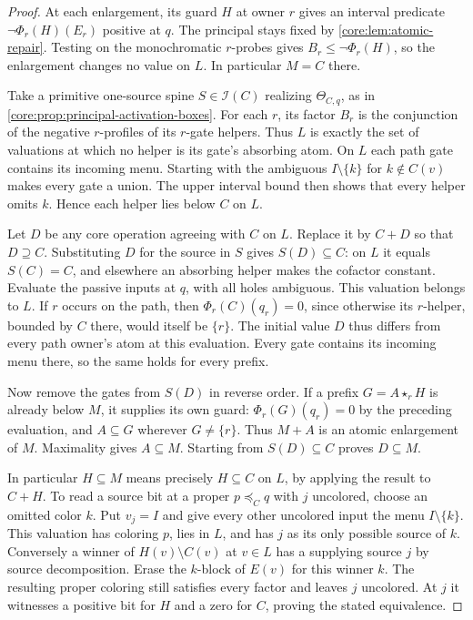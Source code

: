 \begin{proof}
At each enlargement, its guard $H$ at owner $r$ gives an interval
predicate $\neg\Phi_r(H)(E_r)$ positive at $q$. The principal stays
fixed by \cref{core:lem:atomic-repair}. Testing on the monochromatic
$r$-probes gives $B_r\leq\neg\Phi_r(H)$, so the enlargement changes
no value on $L$. In particular $M=C$ there.

Take a primitive one-source spine $S\in\mathcal I(C)$ realizing
$\Theta_{C,q}$, as in \cref{core:prop:principal-activation-boxes}.
For each $r$, its factor $B_r$ is the conjunction of the negative
$r$-profiles of its $r$-gate helpers. Thus $L$ is exactly the set of
valuations at which no helper is its gate's absorbing atom. On $L$
each path gate contains its incoming menu. Starting with the
ambiguous $I\setminus\{k\}$ for $k\notin C(v)$ makes every gate
a union. The upper interval bound then shows that every helper omits
$k$. Hence each helper lies below $C$ on $L$.

Let $D$ be any core operation agreeing with $C$ on $L$. Replace it
by $C+D$ so that $D\supseteq C$. Substituting $D$ for the source
in $S$ gives $S(D)\subseteq C$: on $L$ it equals $S(C)=C$, and
elsewhere an absorbing helper makes the cofactor constant.
Evaluate the passive inputs at $q$, with all holes ambiguous. This
valuation belongs to $L$. If $r$ occurs on the path, then
$\Phi_r(C)(q_r)=0$, since otherwise its $r$-helper, bounded by $C$
there, would itself be $\{r\}$. The initial value $D$ thus differs
from every path owner's atom at this evaluation. Every gate contains
its incoming menu there, so the same holds for every prefix.

Now remove the gates from $S(D)$ in reverse order. If a prefix
$G=A\star_r H$ is already below $M$, it supplies its own guard:
$\Phi_r(G)(q_r)=0$ by the preceding evaluation, and
$A\subseteq G$ wherever $G\ne\{r\}$. Thus $M+A$ is an atomic
enlargement of $M$. Maximality gives $A\subseteq M$. Starting from
$S(D)\subseteq C$ proves $D\subseteq M$.

In particular $H\subseteq M$ means precisely $H\subseteq C$ on $L$,
by applying the result to $C+H$. To read a source bit at a proper
$p\preceq_Cq$ with $j$ uncolored, choose an omitted color $k$. Put
$v_j=I$ and give every other uncolored input the menu
$I\setminus\{k\}$. This valuation has coloring $p$, lies in $L$, and
has $j$ as its only possible source of $k$. Conversely a winner of
$H(v)\setminus C(v)$ at $v\in L$ has a supplying source $j$ by
source decomposition. Erase the $k$-block of $E(v)$ for this winner
$k$. The resulting proper coloring still satisfies every factor and
leaves $j$ uncolored. At $j$ it witnesses a positive bit for $H$ and
a zero for $C$, proving the stated equivalence.


\end{proof}
